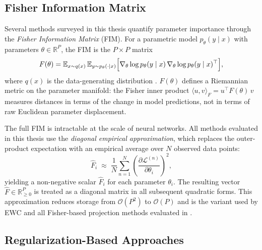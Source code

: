 \subsection{Fisher Information Matrix}
\label{sec:fisher_rw}

Several methods surveyed in this thesis quantify parameter importance through
the \emph{Fisher Information Matrix} (FIM).
For a parametric model $p_\theta(y \mid x)$ with parameters
$\theta \in \mathbb{R}^P$, the FIM is the $P \times P$ matrix
\begin{equation}
    F(\theta)
    = \mathbb{E}_{x \sim q(x)}\,
      \mathbb{E}_{y \sim p_\theta(\cdot \mid x)}
      \Bigl[
        \nabla_\theta \log p_\theta(y \mid x)\,
        \nabla_\theta \log p_\theta(y \mid x)^\top
      \Bigr],
    \label{eq:fim}
\end{equation}
where $q(x)$ is the data-generating distribution \citep{amari_natural_1998}.
$F(\theta)$ defines a Riemannian metric on the parameter manifold: the
Fisher inner product $\langle u, v\rangle_F = u^\top F(\theta)\,v$ measures
distances in terms of the change in model predictions, not in terms of raw
Euclidean parameter displacement.

The full FIM is intractable at the scale of neural networks.
All methods evaluated in this thesis use the \emph{diagonal empirical
approximation}, which replaces the outer-product expectation with an
empirical average over $N$ observed data points:
\begin{equation}
    \hat{F}_i
    \;\approx\;
    \frac{1}{N}\sum_{n=1}^{N}
    \left(\frac{\partial \mathcal{L}^{(n)}}{\partial \theta_i}\right)^{\!2},
    \label{eq:empirical_fisher}
\end{equation}
yielding a non-negative scalar $\hat{F}_i$ for each parameter $\theta_i$.
The resulting vector $\hat{F} \in \mathbb{R}^P_{\geq 0}$ is treated as a
diagonal matrix in all subsequent quadratic forms.
This approximation reduces storage from $\mathcal{O}(P^2)$ to
$\mathcal{O}(P)$ and is the variant used by EWC
\citep{kirkpatrick_overcoming_2017} and all Fisher-based projection methods
evaluated in \citep{garg_fisher-orthogonal_2026}.

\subsection{Regularization-Based Approaches}
\label{sec:rw_regularization}

